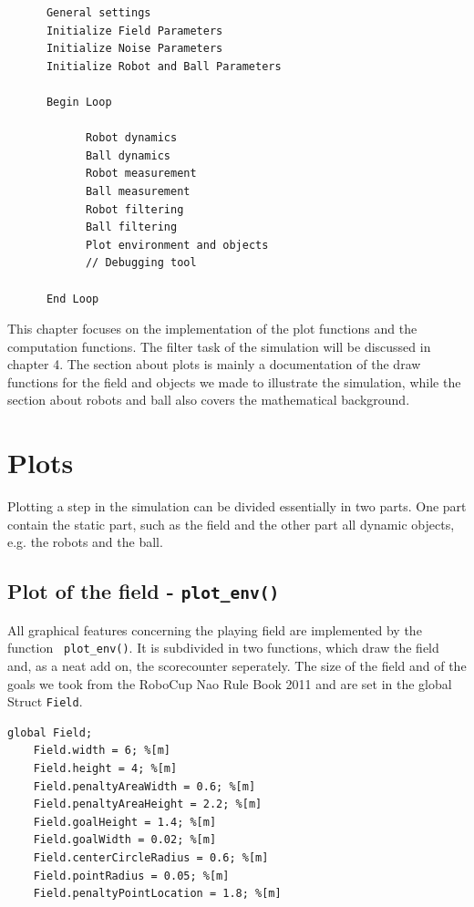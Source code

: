 \begin{verbatim}
      General settings
      Initialize Field Parameters
      Initialize Noise Parameters
      Initialize Robot and Ball Parameters

      Begin Loop
	
            Robot dynamics
            Ball dynamics
            Robot measurement
            Ball measurement
            Robot filtering
            Ball filtering
            Plot environment and objects
            // Debugging tool
	
      End Loop
\end{verbatim}

This chapter focuses on the implementation of the plot functions and the computation functions. The filter task of the simulation will be discussed in chapter 4.
The section about plots is mainly a documentation of the draw functions for the field and objects we made to illustrate the simulation, while the section about robots and ball also covers the mathematical background.

\section{Plots}
Plotting a step in the simulation can be divided essentially in two parts. One part contain the static part, such as the field and the other part all dynamic objects, e.g. the robots and the ball.

\subsection*{Plot of the field - \texttt{plot\_env()} }
All graphical features concerning the playing field are implemented by the function \texttt{ plot\_env()}. It is subdivided in two functions, which draw the field and, as a neat add on, the scorecounter seperately. The size of the field and of the goals we took from the RoboCup Nao Rule Book 2011 and are set in the global Struct \texttt{Field}.
\begin{lstlisting}
global Field;
    Field.width = 6; %[m]
    Field.height = 4; %[m]
    Field.penaltyAreaWidth = 0.6; %[m]
    Field.penaltyAreaHeight = 2.2; %[m]
    Field.goalHeight = 1.4; %[m]
    Field.goalWidth = 0.02; %[m]
    Field.centerCircleRadius = 0.6; %[m]
    Field.pointRadius = 0.05; %[m]
    Field.penaltyPointLocation = 1.8; %[m]
\end{lstlisting}
\vspace{+10pt}

